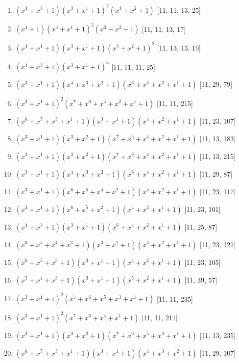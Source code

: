 \documentclass[10pt,twocolumn]{article}
\begin{document}
\begin{enumerate}
\item $(x^{4} + x^{3} + 1)(x^{3} + x^{1} + 1)^{2}(x^{3} + x^{2} + 1)$  [11, 11, 13, 25]
\item $(x^{4} + 1)(x^{3} + x^{1} + 1)^{2}(x^{3} + x^{2} + 1)$  [11, 11, 13, 17]
\item $(x^{4} + x^{1} + 1)(x^{3} + x^{1} + 1)(x^{3} + x^{2} + 1)^{2}$  [11, 13, 13, 19]
\item $(x^{4} + x^{3} + 1)(x^{3} + x^{1} + 1)^{3}$  [11, 11, 11, 25]
\item $(x^{3} + x^{1} + 1)(x^{4} + x^{3} + x^{2} + 1)(x^{6} + x^{3} + x^{2} + x^{1} + 1)$  [11, 29, 79]
\item $(x^{3} + x^{1} + 1)^{2}(x^{7} + x^{6} + x^{4} + x^{2} + x^{1} + 1)$  [11, 11, 215]
\item $(x^{6} + x^{5} + x^{3} + x^{1} + 1)(x^{3} + x^{1} + 1)(x^{4} + x^{2} + x^{1} + 1)$  [11, 23, 107]
\item $(x^{3} + x^{1} + 1)(x^{3} + x^{2} + 1)(x^{7} + x^{5} + x^{4} + x^{2} + x^{1} + 1)$  [11, 13, 183]
\item $(x^{3} + x^{1} + 1)(x^{3} + x^{2} + 1)(x^{7} + x^{6} + x^{4} + x^{2} + x^{1} + 1)$  [11, 13, 215]
\item $(x^{3} + x^{1} + 1)(x^{4} + x^{3} + x^{2} + 1)(x^{6} + x^{4} + x^{2} + x^{1} + 1)$  [11, 29, 87]
\item $(x^{3} + x^{1} + 1)(x^{6} + x^{5} + x^{4} + x^{2} + 1)(x^{4} + x^{2} + x^{1} + 1)$  [11, 23, 117]
\item $(x^{3} + x^{1} + 1)(x^{6} + x^{5} + x^{2} + 1)(x^{4} + x^{2} + x^{1} + 1)$  [11, 23, 101]
\item $(x^{4} + x^{3} + 1)(x^{3} + x^{1} + 1)(x^{6} + x^{4} + x^{2} + x^{1} + 1)$  [11, 25, 87]
\item $(x^{6} + x^{5} + x^{4} + x^{3} + 1)(x^{3} + x^{1} + 1)(x^{4} + x^{2} + x^{1} + 1)$  [11, 23, 121]
\item $(x^{6} + x^{5} + x^{3} + 1)(x^{3} + x^{1} + 1)(x^{4} + x^{2} + x^{1} + 1)$  [11, 23, 105]
\item $(x^{5} + x^{4} + x^{3} + 1)(x^{3} + x^{1} + 1)(x^{5} + x^{2} + x^{1} + 1)$  [11, 39, 57]
\item $(x^{3} + x^{1} + 1)^{2}(x^{7} + x^{6} + x^{5} + x^{3} + x^{1} + 1)$  [11, 11, 235]
\item $(x^{3} + x^{1} + 1)^{2}(x^{7} + x^{6} + x^{4} + x^{1} + 1)$  [11, 11, 211]
\item $(x^{3} + x^{1} + 1)(x^{3} + x^{2} + 1)(x^{7} + x^{6} + x^{5} + x^{3} + x^{1} + 1)$  [11, 13, 235]
\item $(x^{6} + x^{5} + x^{3} + x^{1} + 1)(x^{3} + x^{1} + 1)(x^{4} + x^{3} + x^{2} + 1)$  [11, 29, 107]

\end{enumerate}
\end{document}
